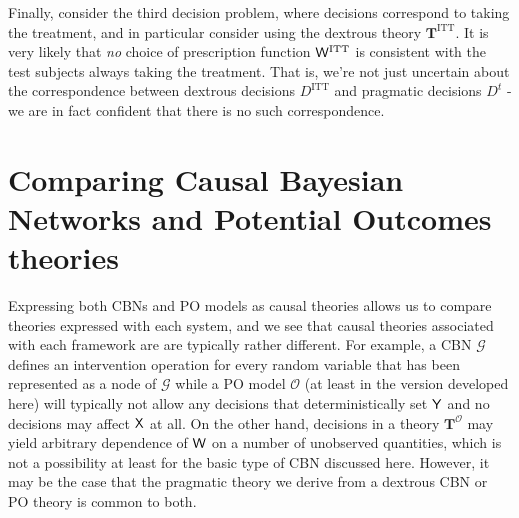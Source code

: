 Finally, consider the third decision problem, where decisions correspond to taking the treatment, and in particular consider using the dextrous theory $\mathbf{T}^{\mathrm{ITT}}$. It is very likely that \emph{no} choice of prescription function $\mathsf{W}^{\mathrm{ITT}}$ is consistent with the test subjects always taking the treatment. That is, we're not just uncertain about the correspondence between dextrous decisions $D^{\mathrm{ITT}}$ and pragmatic decisions $D^t$ - we are in fact confident that there is no such correspondence.

\section{Comparing Causal Bayesian Networks and Potential Outcomes theories}

Expressing both CBNs and PO models as causal theories allows us to compare theories expressed with each system, and we see that causal theories associated with each framework are are typically rather different. For example, a CBN $\mathcal{G}$ defines an intervention operation for every random variable that has been represented as a node of $\mathcal{G}$ while a PO model $\mathscr{O}$ (at least in the version developed here) will typically not allow any decisions that deterministically set $\mathsf{Y}$ and no decisions may affect $\mathsf{X}$ at all. On the other hand, decisions in a theory $\mathbf{T}^{\mathscr{O}}$ may yield arbitrary dependence of $\mathsf{W}$ on a number of unobserved quantities, which is not a possibility at least for the basic type of CBN discussed here. However, it may be the case that the pragmatic theory we derive from a dextrous CBN or PO theory is common to both.

